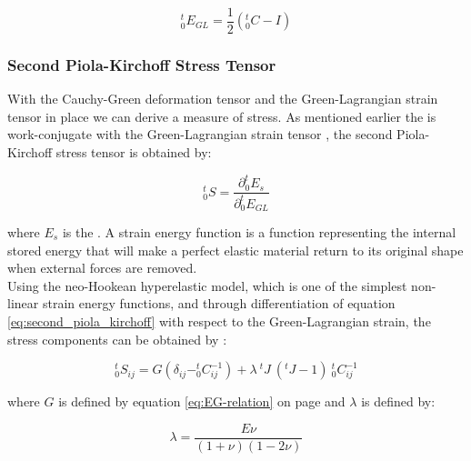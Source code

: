 \begin{equation}
\label{eq:green_lagrange_strain_tensor}
^t_0E_{GL} = \frac{1}{2}( ^t_0C - I)
\end{equation}


\subsubsection*{Second Piola-Kirchoff Stress Tensor}
\label{sec:second_piola_kirchoff_stress_tensor}
With the Cauchy-Green deformation tensor and the Green-Lagrangian
strain tensor in place we can derive a measure of stress. 
As mentioned earlier the  is
work-conjugate with the Green-Lagrangian strain tensor
, the second Piola-Kirchoff stress
tensor is obtained by: 

\begin{equation}
\label{eq:second_piola_kirchoff}
^t_0S = \frac{\partial ^t_0E_s}{\partial ^t_0E_{GL}}
\end{equation}

where $E_s$ is the .
A strain energy function is a function representing the internal
stored energy that will make a perfect elastic material return to
its original shape when external forces are removed. \\

Using the neo-Hookean hyperelastic model, which is one of the simplest
non-linear strain energy functions, and through differentiation of equation 
\eqref{eq:second_piola_kirchoff} with respect to the Green-Lagrangian
strain, the stress components can be obtained by
:

\begin{equation}
\label{eq:second_piola_kirchoff_tensor}
^t_0S_{ij} = G (\delta_{ij} - ^t_0C_{ij}^{-1}) + \lambda \ ^tJ \ (^tJ-1) \ ^t_0C_{ij}^{-1}
\end{equation}

where $G$ is defined by equation \eqref{eq:EG-relation} on page
\pageref{eq:EG-relation} and $\lambda$ is defined by:

\begin{equation}
\lambda = \frac{E\nu}{(1+\nu)(1-2\nu)}
\end{equation}

